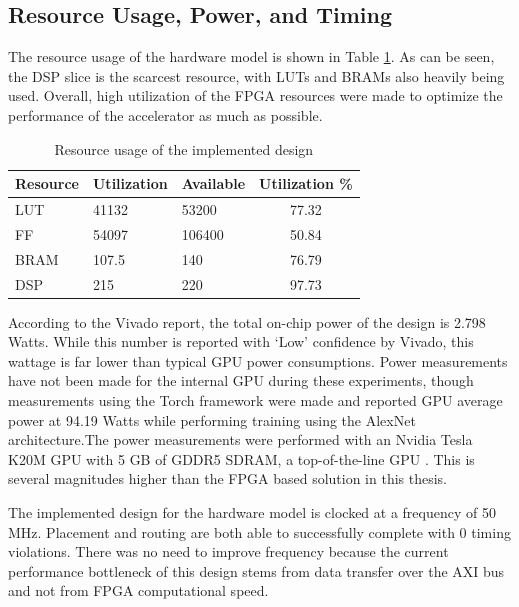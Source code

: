 \subsection{Resource Usage, Power, and Timing}
The resource usage of the hardware model is shown in Table \ref{resource-usage}. As can be seen, the DSP slice is the scarcest resource, with LUTs and BRAMs also heavily being used.  Overall, high utilization of the FPGA resources were made to optimize the performance of the accelerator as much as possible.
\begin{table}
	\centering 
	\begin{tabular}{|l|l|l|c|}
	\hline 
	\textbf{Resource} & \textbf{Utilization} & \textbf{Available} & \textbf{Utilization \%} \\\hline 
	LUT & 41132 & 53200 & 77.32		\\\hline
	FF & 54097 & 106400 & 50.84 \\\hline 
	BRAM & 107.5 & 140 & 76.79 \\\hline 
	DSP & 215 & 220 & 97.73 \\\hline	
	\end{tabular}
\caption{Resource usage of the implemented design}
\label{resource-usage}
\end{table}

According to the Vivado report, the total on-chip power of the design is 2.798 Watts. While this number is reported with `Low' confidence by Vivado, this wattage is far lower than typical GPU power consumptions. Power measurements have not been made for the internal GPU during these experiments, though measurements using the Torch framework were made and reported GPU average power at 94.19 Watts while performing training using the AlexNet architecture.The power measurements were performed with an Nvidia Tesla K20M GPU with 5 GB of GDDR5 SDRAM, a top-of-the-line GPU \cite{xinbochen2016}. This is several magnitudes higher than the FPGA based solution in this thesis. 

The implemented design for the hardware model is clocked at a frequency of 50 MHz. Placement and routing are both able to successfully complete with 0 timing violations. There was no need to improve frequency because the current performance bottleneck of this design stems from data transfer over the AXI bus and not from FPGA computational speed.